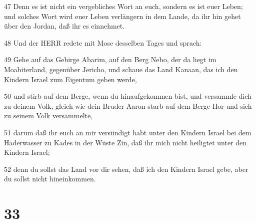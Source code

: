 \par 47 Denn es ist nicht ein vergebliches Wort an euch, sondern es ist euer Leben; und solches Wort wird euer Leben verlängern in dem Lande, da ihr hin gehet über den Jordan, daß ihr es einnehmet.
\par 48 Und der HERR redete mit Mose desselben Tages und sprach:
\par 49 Gehe auf das Gebirge Abarim, auf den Berg Nebo, der da liegt im Moabiterland, gegenüber Jericho, und schaue das Land Kanaan, das ich den Kindern Israel zum Eigentum geben werde,
\par 50 und stirb auf dem Berge, wenn du hinaufgekommen bist, und versammle dich zu deinem Volk, gleich wie dein Bruder Aaron starb auf dem Berge Hor und sich zu seinem Volk versammelte,
\par 51 darum daß ihr euch an mir versündigt habt unter den Kindern Israel bei dem Haderwasser zu Kades in der Wüste Zin, daß ihr mich nicht heiligtet unter den Kindern Israel;
\par 52 denn du sollst das Land vor dir sehen, daß ich den Kindern Israel gebe, aber du sollst nicht hineinkommen.

\chapter{33}

